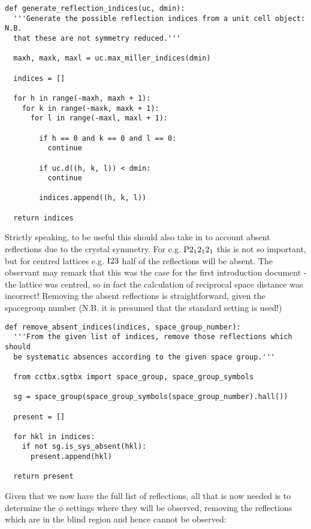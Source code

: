 \documentclass[a4paper, 11pt]{article}
\begin{document}
{\small
\begin{verbatim}
def generate_reflection_indices(uc, dmin):
  '''Generate the possible reflection indices from a unit cell object: N.B.
  that these are not symmetry reduced.'''

  maxh, maxk, maxl = uc.max_miller_indices(dmin)

  indices = []

  for h in range(-maxh, maxh + 1):
    for k in range(-maxk, maxk + 1):
      for l in range(-maxl, maxl + 1):

        if h == 0 and k == 0 and l == 0:
          continue

        if uc.d((h, k, l)) < dmin:
          continue

        indices.append((h, k, l))

  return indices 
\end{verbatim}
}

Strictly speaking, to be useful this should also take in to account absent reflections due to the crystal symmetry. For e.g. $\rm{P} 2_1 2_1 2_1$ this is not so important, but for centred lattices e.g. $\rm{I} 2 3$ half of the reflections will be absent. The observant may remark that this was the case for the first introduction document - the lattice was centred, so in fact the calculation of reciprocal space distance was incorrect! Removing the absent reflections is straightforward, given the spacegroup number (N.B. it is presumed that the standard setting is used!)

{\small
\begin{verbatim}
def remove_absent_indices(indices, space_group_number):
  '''From the given list of indices, remove those reflections which should
  be systematic absences according to the given space group.'''

  from cctbx.sgtbx import space_group, space_group_symbols

  sg = space_group(space_group_symbols(space_group_number).hall())

  present = []

  for hkl in indices:
    if not sg.is_sys_absent(hkl):
      present.append(hkl)

  return present
\end{verbatim}
}

Given that we now have the full list of reflections, all that is now needed is to determine the $\phi$ settings where they will be observed, removing the reflections which are in the blind region and hence cannot be observed:
\end{document}
